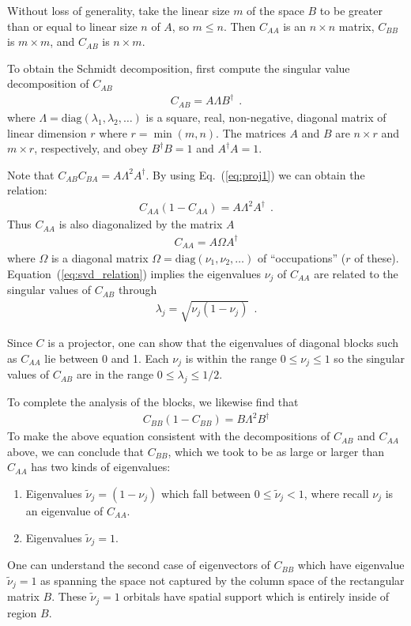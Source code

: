 \documentclass[aps, superscriptaddress, floatfix, onecolumn]{revtex4-2}
\begin{document}
Without loss of generality, take the linear size $m$ of the space $B$ to be greater than or equal to linear size $n$ of $A$, so $m \leq n$.
Then $C_{AA}$ is an $n \times n$ matrix, $C_{BB}$ is $m \times m$, and $C_{AB}$ is $n \times m$.

To obtain the Schmidt decomposition, first compute the singular value decomposition of $C_{AB}$
\begin{align}
C_{AB} = A \Lambda B^\dagger \ \ .
\end{align}
where $\Lambda = \text{diag}(\lambda_1, \lambda_2, \ldots)$ is a square, real, non-negative, diagonal matrix of linear dimension $r$ where
$r = \min(m,n)$.
The matrices  $A$ and $B$ are $n \times r$ and $m \times r$, respectively, and obey
$B^\dagger B = 1$ and $A^\dagger A = 1$.

Note that $C_{AB} C_{BA} = A \Lambda^2 A^\dagger$. By using Eq.~(\ref{eq:proj1}) we can obtain the relation:
\begin{align}
C_{AA} (1-C_{AA}) = A \Lambda^2 A^\dagger \ \ . \label{eq:svd_relation}
\end{align}
Thus $C_{AA}$ is also diagonalized by the matrix $A$
\begin{align}
C_{AA} = A \Omega A^\dagger
\end{align}
where $\Omega$ is a diagonal matrix $\Omega = \text{diag}(\nu_1, \nu_2, \ldots)$ of ``occupations'' ($r$ of these). 
Equation~(\ref{eq:svd_relation}) implies the eigenvalues $\nu_j$ of $C_{AA}$ are related to the 
singular values of $C_{AB}$ through 
\begin{align}
\lambda_j = \sqrt{\nu_j (1-\nu_j)} \ \ .
\end{align}

Since $C$ is a projector, one can show that the eigenvalues of diagonal blocks such as $C_{AA}$ lie between 0 and 1. 
Each $\nu_j$ is within the range $0 \leq \nu_j \leq 1$ so the singular values of $C_{AB}$ are in the range $0 \leq \lambda_j \leq 1/2$.

To complete the analysis of the blocks, we likewise find that
\begin{align}
C_{BB} (1-C_{BB}) = B \Lambda^2 B^\dagger
\end{align}
To make the above equation consistent with the decompositions of $C_{AB}$ and $C_{AA}$ above, we can conclude that $C_{BB}$, which we took to
be as large or larger than $C_{AA}$ has two kinds of eigenvalues:
\begin{enumerate}
\item Eigenvalues $\tilde{\nu}_j = (1-\nu_j)$ which fall between $0 \leq \tilde{\nu}_j < 1$, where recall $\nu_j$ is an eigenvalue of $C_{AA}$.
\item Eigenvalues $\tilde{\nu}_j = 1$.
\end{enumerate}
One can understand the second case of eigenvectors of $C_{BB}$ which have eigenvalue $\tilde{\nu}_j = 1$ as spanning the space not captured by 
the column space of the rectangular matrix $B$.
These $\tilde{\nu}_j = 1$ orbitals have spatial support which is entirely inside of region $B$.
\end{document}
